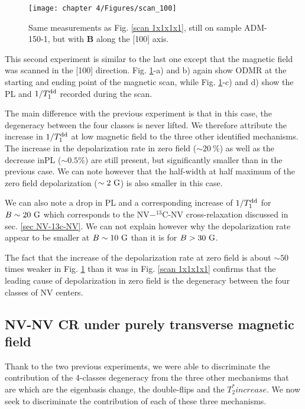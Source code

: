 \documentclass[a4paper, 11pt]{report}
\begin{document}
\begin{figure}[h]
\centering
\texttt{[image: chapter 4/Figures/scan\_100]}
\caption{Same measurements as Fig. \ref{scan 1x1x1x1}, still on sample ADM-150-1, but with $\mathbf{B}$ along the [100] axis.}
\label{scan 100}
\end{figure}

This second experiment is similar to the last one except that the magnetic field was scanned in the [100] direction. Fig. \ref{scan 100}-a) and b) again show ODMR at the starting and ending point of the magnetic scan, while Fig. \ref{scan 100}-c) and d) show the PL and $1/T_1^{\rm dd}$ recorded during the scan.

The main difference with the previous experiment is that in this case, the degeneracy between the four classes is never lifted. We therefore attribute the increase in $1/T_1^{\rm dd}$ at low magnetic field to the three other identified mechanisms. The increase in the depolarization rate in zero field ($\sim 20\ \%$) as well as the decrease inPL ($\sim 0.5 \%$) are still present, but significantly smaller than in the previous case. We can note however that the half-width at half maximum of the zero field depolarization ($\sim 2\ \rm G$) is also smaller in this case.

We can also note a drop in PL and a corresponding increase of $1/T_1^{\rm dd}$ for $B \sim 20\ \rm G$ which corresponds to the NV$-^{13}$C-NV cross-relaxation discussed in sec. \ref{sec NV-13c-NV}. We can not explain however why the depolarization rate appear to be smaller at $B \sim 10\ \rm G$ than it is for $B > 30\ \rm G$.

The fact that the increase of the depolarization rate at zero field is about $\sim 50$ times weaker in Fig. \ref{scan 100} than it was in Fig. \ref{scan 1x1x1x1} confirms that the leading cause of depolarization in zero field is the degeneracy between the four classes of NV centers. 

\subsection{NV-NV CR under purely transverse magnetic field}

Thank to the two previous experiments, we were able to discriminate the contribution of the 4-classes degeneracy from the three other mechanisms that are which are the eigenbasis change, the double-flips and the $T_2^* increase$. We now seek to discriminate the contribution of each of these three mechanisms.
\end{document}
